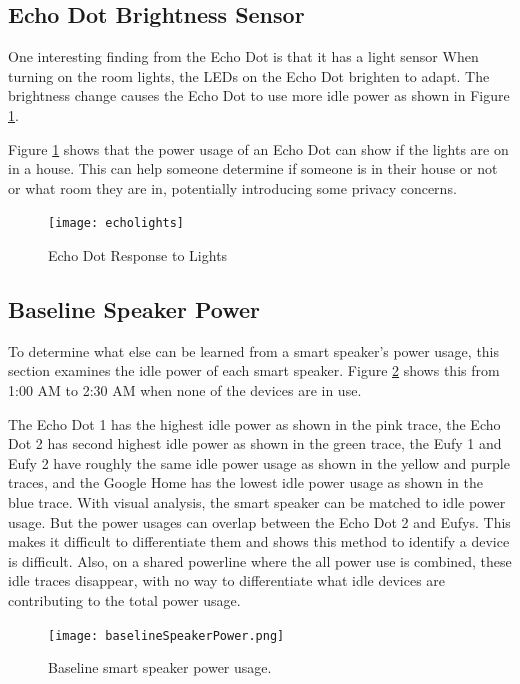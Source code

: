 \subsection{Echo Dot Brightness Sensor}
\label{Echo Dot Brightness Sensor}
One interesting finding from the Echo Dot is that it has a light sensor When turning on the room lights, the LEDs on the Echo Dot brighten to adapt. The brightness change causes the Echo Dot to use more idle power as shown in Figure \ref{fig:echolights}.

Figure \ref{fig:echolights} shows that the power usage of an Echo Dot can show if the lights are on in a house. This can help someone determine if someone is in their house or not or what room they are in, potentially introducing some privacy concerns.

\begin{figure}[H]
    \centering
    \texttt{[image: echolights]}
    \caption{Echo Dot Response to Lights}
    \label{fig:echolights}
\end{figure}

\subsection{Baseline Speaker Power}
\label{Baseline Speaker Power}
To determine what else can be learned from a smart speaker's power usage, this section examines the idle power of each smart speaker. Figure \ref{fig:baselineSpeakerPower} shows this from 1:00 AM to 2:30 AM when none of the devices are in use.

The Echo Dot 1 has the highest idle power as shown in the pink trace, the Echo Dot 2 has second highest idle power as shown in the green trace, the Eufy 1 and Eufy 2 have roughly the same idle power usage as shown in the yellow and purple traces, and the Google Home has the lowest idle power usage as shown in the blue trace. With visual analysis, the smart speaker can be matched to idle power usage. But the power usages can overlap between the Echo Dot 2 and Eufys. This makes it difficult to differentiate them and shows this method to identify a device is difficult. Also, on a shared powerline where the all power use is combined, these idle traces disappear, with no way to differentiate what idle devices are contributing to the total power usage.

\begin{figure}[H]
    \centering
    \texttt{[image: baselineSpeakerPower.png]}
    \caption{Baseline smart speaker power usage.}
    \label{fig:baselineSpeakerPower}
\end{figure}

